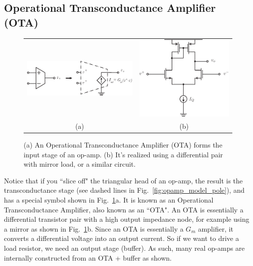 \subsection{Operational Transconductance Amplifier (OTA)}
\begin{figure}[tb]
\centering
\begin{tabular}{cc}
\includegraphics[scale=1.25]{OTA} &
\includegraphics[width=.3\columnwidth]{Diffpair_se_output.pdf}\\
(a) & (b)\\
\end{tabular}
\caption{(a) An Operational Transconductance Amplifier (OTA) forms the input stage of an op-amp.  (b) It's realized using a differential pair with mirror load, or a similar circuit.}
\label{fig:OTA}
\end{figure}
Notice that if you ``slice off" the triangular head of an op-amp, the result is the transconductance stage (see dashed lines in Fig.~\ref{fig:opamp_model_pole}), and has a special symbol shown in Fig.~\ref{fig:OTA}a.  It is known as an Operational Transconductance Amplifier, also known as an ``OTA".  An OTA is essentially a differential transistor pair with a high output impedance node, for example using a mirror as shown in Fig.~\ref{fig:OTA}b.
Since an OTA is essentially a $G_m$ amplifier, it converts a differential voltage into an output current.  So if we want to drive a load resistor, we need an output stage (buffer).  As such, many real op-amps are internally constructed from an OTA + buffer as shown.
